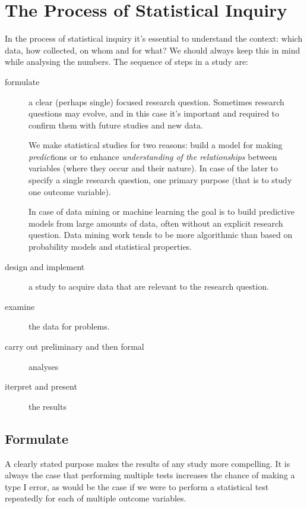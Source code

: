 \chapter*{The Process of Statistical Inquiry}

\setcounter{section}{0}
\renewcommand*{\theHsection}{ch8.\the\value{section}}

In the process of statistical inquiry it's essential to understand the  context:
which data, how collected, on whom and for what? We should always keep this in
mind while analysing the numbers. The sequence of steps in a study are:

\begin{description}
	\item[formulate] a clear (perhaps single) focused research question. Sometimes
	      research questions may evolve, and in this case it's important and required to
	      confirm them with future studies and new data.

	      We make statistical studies for two reasons: build a model for making
	      \emph{predict}ions or to enhance \emph{understanding of the relationships}
	      between variables (where they occur and their nature). In case of the later to
	      specify a single research question, one primary purpose (that is to study one
	      outcome variable).

	      In case of data mining or machine learning the goal is to build predictive
	      models from large amounts of data, often without an explicit research
	      question. Data mining work tends to be more algorithmic than based on
	      probability models and statistical properties.
	\item[design and implement] a study to acquire data that are relevant to the
	      research question.
	\item[examine] the data for problems.
	\item[carry out preliminary and then formal] analyses
	\item[iterpret and present] the results
\end{description}

\section{Formulate}

A clearly stated purpose makes the results of any study more compelling. It is
always the case that performing multiple tests increases the chance of making a
type I error, as would be the case if we were to perform a statistical test
repeatedly for each of multiple outcome variables.

